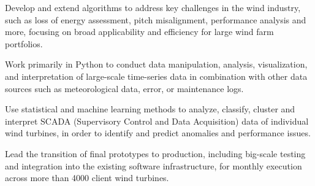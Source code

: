 \begin{tightemize}
    \item Develop and extend algorithms to address key challenges in the wind industry, such as loss of energy assessment, pitch misalignment, performance analysis and more, focusing on broad applicability and efficiency for large wind farm portfolios.
    \item Work primarily in Python to conduct data manipulation, analysis, visualization, and interpretation of large-scale time-series data in combination with other data sources such as meteorological data, error, or maintenance logs.
    \item Use statistical and machine learning methods to analyze, classify, cluster and interpret SCADA (Supervisory Control and Data Acquisition) data of individual wind turbines, in order to identify and predict anomalies and performance issues.
    \item Lead the transition of final prototypes to production, including big-scale testing and integration into the existing software infrastructure, for monthly execution across more than 4000 client wind turbines.
\end{tightemize}
